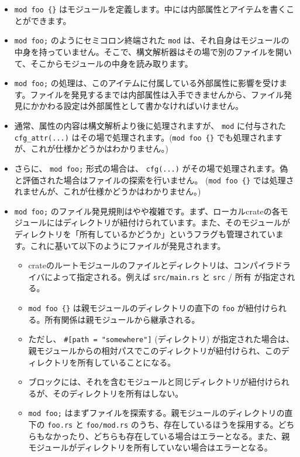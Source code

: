 \documentclass[dvipdfmx,uplatex,papersize,a4paper,10pt]{jsbook}
\theoremstyle{definition}
\begin{document}
\begin{itemize}
  \item \verb|mod foo {}| はモジュールを定義します。中には内部属性とアイテムを書くことができます。
  \item \verb|mod foo;| のようにセミコロン終端された \verb|mod| は、それ自身はモジュールの中身を持っていません。そこで、構文解析器はその場で別のファイルを開いて、そこからモジュールの中身を読み取ります。
  \item \verb|mod foo;| の処理は、このアイテムに付属している外部属性に影響を受けます。ファイルを発見するまでは内部属性は入手できませんから、ファイル発見にかかわる設定は外部属性として書かなければいけません。
  \item 通常、属性の内容は構文解析より後に処理されますが、 \verb|mod| に付与された \verb|cfg_attr(...)| はその場で処理されます。(\verb|mod foo {}| でも処理されますが、これが仕様かどうかはわかりません。)
  \item さらに、 \verb|mod foo;| 形式の場合は、 \verb|cfg(...)| がその場で処理されます。偽と評価された場合はファイルの探索を行いません。 (\verb|mod foo {}| では処理されませんが、これが仕様かどうかはわかりません。)
  \item \verb|mod foo;| のファイル発見規則はやや複雑です。まず、ローカルcrateの各モジュールにはディレクトリが紐付けられています。また、そのモジュールがディレクトリを「所有しているかどうか」というフラグも管理されています。これに基いて以下のようにファイルが発見されます。
    \begin{itemize}
      \item crateのルートモジュールのファイルとディレクトリは、コンパイラドライバによって指定される。例えば \verb|src/main.rs| と \verb|src| / 所有 が指定される。
      \item \verb|mod foo {}| は親モジュールのディレクトリの直下の \verb|foo| が紐付けられる。所有関係は親モジュールから継承される。
      \item ただし、 \verb|#[path = "somewhere"]| (ディレクトリ) が指定された場合は、親モジュールからの相対パスでこのディレクトリが紐付けられ、このディレクトリを所有していることになる。
      \item ブロックには、それを含むモジュールと同じディレクトリが紐付けられるが、そのディレクトリを所有はしない。
      \item \verb|mod foo;| はまずファイルを探索する。親モジュールのディレクトリの直下の \verb|foo.rs| と \verb|foo/mod.rs| のうち、存在しているほうを採用する。どちらもなかったり、どちらも存在している場合はエラーとなる。また、親モジュールがディレクトリを所有していない場合はエラーとなる。

\end{itemize}
\end{itemize}
\end{document}
